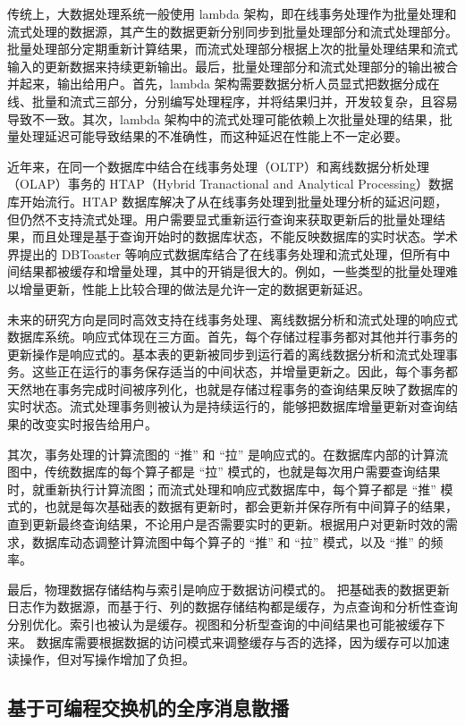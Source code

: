 传统上，大数据处理系统一般使用 lambda 架构，即在线事务处理作为批量处理和流式处理的数据源，其产生的数据更新分别同步到批量处理部分和流式处理部分。批量处理部分定期重新计算结果，而流式处理部分根据上次的批量处理结果和流式输入的更新数据来持续更新输出。最后，批量处理部分和流式处理部分的输出被合并起来，输出给用户。首先，lambda 架构需要数据分析人员显式把数据分成在线、批量和流式三部分，分别编写处理程序，并将结果归并，开发较复杂，且容易导致不一致。其次，lambda 架构中的流式处理可能依赖上次批量处理的结果，批量处理延迟可能导致结果的不准确性，而这种延迟在性能上不一定必要。

近年来，在同一个数据库中结合在线事务处理（OLTP）和离线数据分析处理（OLAP）事务的 HTAP（Hybrid Tranactional and Analytical Processing）数据库开始流行。HTAP 数据库解决了从在线事务处理到批量处理分析的延迟问题，但仍然不支持流式处理。用户需要显式重新运行查询来获取更新后的批量处理结果，而且处理是基于查询开始时的数据库状态，不能反映数据库的实时状态。学术界提出的 DBToaster 等响应式数据库结合了在线事务处理和流式处理，但所有中间结果都被缓存和增量处理，其中的开销是很大的。例如，一些类型的批量处理难以增量更新，性能上比较合理的做法是允许一定的数据更新延迟。

未来的研究方向是同时高效支持在线事务处理、离线数据分析和流式处理的响应式数据库系统。响应式体现在三方面。首先，每个存储过程事务都对其他并行事务的更新操作是响应式的。基本表的更新被同步到运行着的离线数据分析和流式处理事务。这些正在运行的事务保存适当的中间状态，并增量更新之。因此，每个事务都天然地在事务完成时间被序列化，也就是存储过程事务的查询结果反映了数据库的实时状态。流式处理事务则被认为是持续运行的，能够把数据库增量更新对查询结果的改变实时报告给用户。

其次，事务处理的计算流图的 ``推'' 和 ``拉'' 是响应式的。在数据库内部的计算流图中，传统数据库的每个算子都是 ``拉'' 模式的，也就是每次用户需要查询结果时，就重新执行计算流图；而流式处理和响应式数据库中，每个算子都是 ``推'' 模式的，也就是每次基础表的数据有更新时，都会更新并保存所有中间算子的结果，直到更新最终查询结果，不论用户是否需要实时的更新。根据用户对更新时效的需求，数据库动态调整计算流图中每个算子的 ``推'' 和 ``拉'' 模式，以及 ``推'' 的频率。

最后，物理数据存储结构与索引是响应于数据访问模式的。
把基础表的数据更新日志作为数据源，而基于行、列的数据存储结构都是缓存，为点查询和分析性查询分别优化。索引也被认为是缓存。视图和分析型查询的中间结果也可能被缓存下来。
数据库需要根据数据的访问模式来调整缓存与否的选择，因为缓存可以加速读操作，但对写操作增加了负担。

\iffalse
\subsection{基于可编程交换机的全序消息散播}


